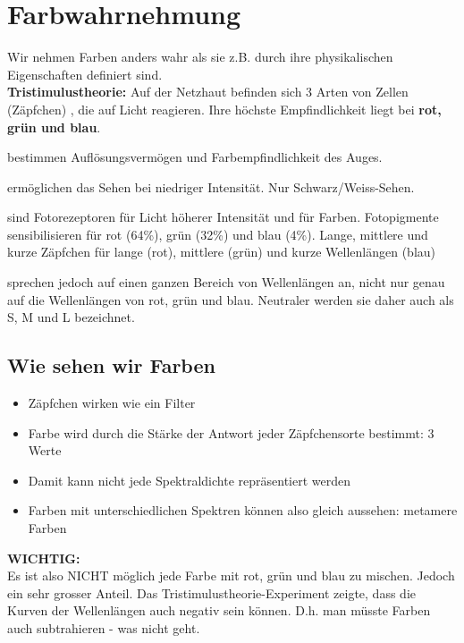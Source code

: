 \section{Farbwahrnehmung}
Wir nehmen Farben anders wahr als sie z.B. durch ihre physikalischen Eigenschaften definiert sind.\\
\textbf{Tristimulustheorie:} Auf der Netzhaut befinden sich 3 Arten von Zellen (Zäpfchen) , die auf Licht reagieren. Ihre höchste Empfindlichkeit liegt bei \textbf{rot, grün und blau}.
\begin{description}[labelindent=1cm]
  \item[Stäbchen und Zäpfchen] bestimmen Auflösungsvermögen und Farbempfindlichkeit des Auges.
  \item[Stäbchen (75-150 x 10ˆ6)] ermöglichen das Sehen bei niedriger Intensität. Nur Schwarz/Weiss-Sehen.
  
  \item[Zäpfchen (6-7 x 10ˆ6)] sind Fotorezeptoren für Licht höherer Intensität und für Farben. Fotopigmente sensibilisieren für rot (64\%), grün (32\%) und blau (4\%). Lange, mittlere und kurze Zäpfchen für lange (rot), mittlere (grün) und kurze Wellenlängen (blau)
  
  \item[Die Zäpfchen] sprechen jedoch auf einen ganzen Bereich von Wellenlängen an, nicht nur genau auf die Wellenlängen von rot, grün und blau. Neutraler werden sie daher auch als S, M und L bezeichnet.
\end{description}

  
\subsection{Wie sehen wir Farben}
\begin{itemize}
    \item Zäpfchen wirken wie ein Filter
    \item Farbe wird durch die Stärke der Antwort jeder Zäpfchensorte bestimmt: 3 Werte
    \item Damit kann nicht jede Spektraldichte repräsentiert werden
    \item Farben mit unterschiedlichen Spektren können also gleich aussehen: metamere Farben
\end{itemize}
\noindent
\textbf{WICHTIG:}\\Es ist also NICHT möglich jede Farbe mit rot, grün und blau zu mischen. Jedoch ein sehr grosser Anteil.
Das Tristimulustheorie-Experiment zeigte, dass die Kurven der Wellenlängen auch negativ sein können. D.h. man müsste Farben auch subtrahieren - was nicht geht. 

